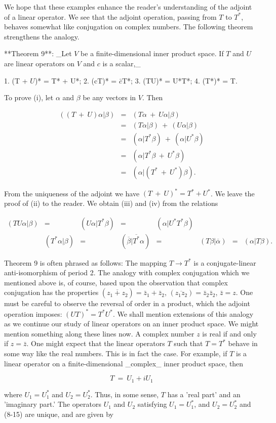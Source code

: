 We hope that these examples enhance the reader's understanding of the adjoint of a linear operator. We see that the adjoint operation, passing from \(T\) to \(T^{*}\), behaves somewhat like conjugation on complex numbers. The following theorem strengthens the analogy.

**Theorem 9**: _Let \(V\) be a finite-dimensional inner product space. If \(T\) and \(U\) are linear operators on \(V\) and \(c\) is a scalar,_

1. (T + \(U\))* = T* + U*;
2. (cT)* = \(\bar{c}\)T*;
3. (TU)* = U*T*;
4. (T*)* = T.

To prove (i), let \(\alpha\) and \(\beta\) be any vectors in \(V\). Then

\[\begin{array}{rcl}((T\ +\ U)\alpha|\beta)&=&(T\alpha\ +\ U\alpha|\beta)\\ &=&(T\alpha|\beta)\ +\ (U\alpha|\beta)\\ &=&(\alpha|T^{*}\beta)\ +\ (\alpha|U^{*}\beta)\\ &=&(\alpha|T^{*}\beta\ +\ U^{*}\beta)\\ &=&(\alpha|(T^{*}\ +\ U^{*})\beta).\end{array}\]

From the uniqueness of the adjoint we have \((T\ +\ U)^{*}=T^{*}+U^{*}\). We leave the proof of (ii) to the reader. We obtain (iii) and (iv) from the relations

\[\begin{array}{rcl}(TU\alpha|\beta)&=&(U\alpha|T^{*}\beta)&=&(\alpha|U^{*}T^{* }\beta)\\ &(T^{*}\alpha|\beta)&=&(\overline{\beta}|\overline{T^{*}}\alpha)&=&(T\beta| \overline{\alpha})&=&(\alpha|T\beta).\end{array}\]

Theorem 9 is often phrased as follows: The mapping \(T\to T^{*}\) is a conjugate-linear anti-isomorphism of period 2. The analogy with complex conjugation which we mentioned above is, of course, based upon the observation that complex conjugation has the properties \((\overline{z_{1}+z_{2}})=\bar{z}_{1}+\bar{z}_{2}\), \((\overline{z_{1}z_{2}})=\bar{z}_{2}\bar{z}_{2}\), \(\bar{z}=z\). One must be careful to observe the reversal of order in a product, which the adjoint operation imposes: \((UT)^{*}=T^{*}U^{*}\). We shall mention extensions of this analogy as we continue our study of linear operators on an inner product space. We might mention something along these lines now. A complex number \(z\) is real if and only if \(z=\bar{z}\). One might expect that the linear operators \(T\) such that \(T=T^{*}\) behave in some way like the real numbers. This is in fact the case. For example, if \(T\) is a linear operator on a finite-dimensional _complex_ inner product space, then

\[T\ =\ U_{1}+iU_{1}\]

where \(U_{1}=U^{*}_{1}\) and \(U_{2}=U^{*}_{2}\). Thus, in some sense, \(T\) has a 'real part' and an 'imaginary part.' The operators \(U_{1}\) and \(U_{2}\) satisfying \(U_{1}=U^{*}_{1}\), and \(U_{2}=U^{*}_{2}\) and (8-15) are unique, and are given by 